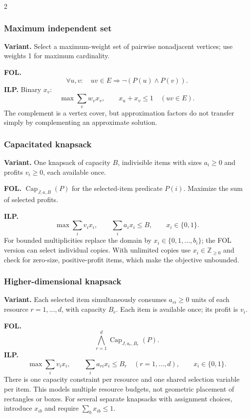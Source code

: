 \documentclass[8pt]{extarticle}
\theoremstyle{definition}
\begin{document}
\begin{multicols*}{2}
\subsubsection{Maximum independent set}\label{form:independent}
\textbf{Variant.} Select a maximum-weight set of pairwise nonadjacent
vertices; use weights 1 for maximum cardinality.

\textbf{FOL.}
\[
 \forall u,v:\quad uv\in E\Rightarrow\neg(P(u)\land P(v)).
\]
\textbf{ILP.} Binary $x_v$:
\[
 \max\sum_vw_vx_v,\qquad x_u+x_v\le1\quad(uv\in E).
\]
The complement is a vertex cover, but approximation factors do not
transfer simply by complementing an approximate solution.

\subsubsection{Capacitated knapsack}\label{form:knapsack}
\textbf{Variant.} One knapsack of capacity $B$, indivisible items with
sizes $a_i\ge0$ and profits $v_i\ge0$, each available once.

\textbf{FOL.} $\operatorname{Cap}_{J,a,B}(P)$ for the selected-item predicate
$P(i)$. Maximize the sum of selected profits.

\textbf{ILP.}
\[
 \max\sum_i v_ix_i,\qquad
 \sum_i a_ix_i\le B,\qquad x_i\in\{0,1\}.
\]
For bounded multiplicities replace the domain by
$x_i\in\{0,1,\ldots,b_i\}$; the FOL version can select individual copies.
With unlimited copies use $x_i\in\mathbb Z_{\ge0}$ and check for
zero-size, positive-profit items, which make the objective unbounded.

\subsubsection{Higher-dimensional knapsack}\label{form:multiknapsack}
\textbf{Variant.} Each selected item simultaneously consumes $a_{ri}\ge0$
units of each resource $r=1,\ldots,d$, with capacity $B_r$. Each item is
available once; its profit is $v_i$.

\textbf{FOL.}
\[
 \bigwedge_{r=1}^d\operatorname{Cap}_{J,a_r,B_r}(P).
\]
\textbf{ILP.}
\[
 \max\sum_i v_ix_i,\qquad
 \sum_i a_{ri}x_i\le B_r\quad(r=1,\ldots,d),
 \qquad x_i\in\{0,1\}.
\]
There is one capacity constraint per resource and one shared selection
variable per item. This models multiple resource budgets, not geometric
placement of rectangles or boxes. For several separate knapsacks with
assignment choices, introduce $x_{ib}$ and require $\sum_bx_{ib}\le1$.


\end{multicols*}
\end{document}
